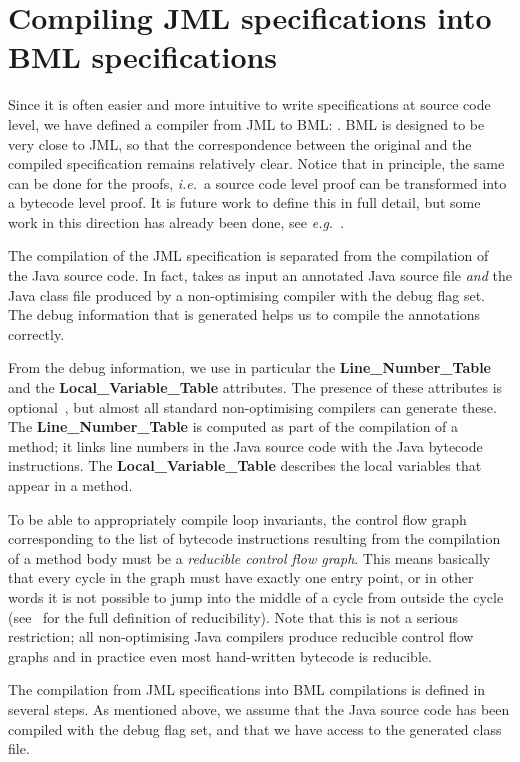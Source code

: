\section{Compiling JML specifications into BML specifications}\label{SecJMLtoBML} 

Since it is often easier and more intuitive to write specifications at
source code level, we have defined a compiler from JML to BML:
\JMLtoBML. BML is designed to be very close to JML, so that the
correspondence between the original and the compiled specification
remains relatively clear. Notice that in principle, the same can be
done for the proofs,
\emph{i.e.}\ a source code level proof can be transformed into a
bytecode level proof. It is future work to define this in full detail,
but some work in this direction has already been done, see
\emph{e.g.}~\cite{BartheRS05}. 

The compilation of the JML specification is separated from the
compilation of the Java source code. In fact, \JMLtoBML takes as input
an annotated Java source file \emph{and} the Java class file produced
by a non-optimising compiler with the debug flag set. The debug
information that is generated helps us to compile the annotations
correctly. 

From the debug information, we use in particular the
\textbf{Line\_Number\_Table} and the \textbf{Local\_Variable\_Table}
attributes. The presence of these attributes is
optional~\cite{JVMspec}, but almost all standard non-optimising
compilers can generate these. The \textbf{Line\_Number\_Table} is
computed as part of the compilation of a method; it links line numbers
in the Java source code with the Java bytecode instructions.  The
\textbf{Local\_Variable\_Table} describes the local variables that
appear in a method.  

To be able to appropriately compile loop invariants, the control flow
graph corresponding to the list of bytecode instructions resulting
from the compilation of a method body must be a
\emph{reducible control flow graph}. This means basically that every 
cycle in the graph must have exactly one entry point, or in other words
 it is not possible to jump into the middle of a cycle from outside the cycle
(see~\cite{AhoSU86} for the full definition of reducibility). Note
that this is not a serious restriction; all non-optimising Java
compilers produce reducible control flow graphs and in practice even
most hand-written bytecode is reducible.

The compilation from JML specifications into BML compilations is
defined in several steps. As mentioned above, we assume that the Java
source code has been compiled with the debug flag set, and that we
have access to the generated class file.

